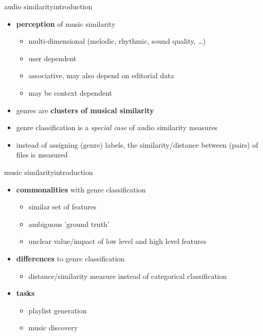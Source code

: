        \begin{frame}{audio similarity}{introduction}
            \begin{itemize}
                \item   \textbf{perception} of music similarity
                    \begin{itemize}
                        \item	multi-dimensional (melodic, rhythmic, sound quality, \ldots)
                        \item	user dependent
                        \item	associative, may also depend on editorial data
                        \item	may be context dependent
                    \end{itemize}
                \bigskip
                \item<2->   genres are \textbf{clusters of musical similarity}
                \item<2->[$\Rightarrow$]	genre classification is a \textit{special case} of audio similarity measures
                \item<3->	instead of assigning (genre) labels, the similarity/distance between (pairs) of files is measured
            \end{itemize}
        \end{frame}
        \begin{frame}{music similarity}{introduction}
            \begin{itemize}
                \item	\textbf{commonalities} with genre classification
                    \begin{itemize}
                        \item	similar set of features
                        \item	ambiguous 'ground truth'
                        \item   unclear value/impact of low level and high level features
                    \end{itemize}
                \bigskip
                \item<2->	 \textbf{differences} to genre classification
                    \begin{itemize}
                        \item	distance/similarity measure instead of categorical classification
                    \end{itemize}
                \bigskip
                \item<3->	 \textbf{tasks}
                    \begin{itemize}
                        \item   playlist generation
                        \item   music discovery
                    \end{itemize}
            \end{itemize}
        \end{frame}
